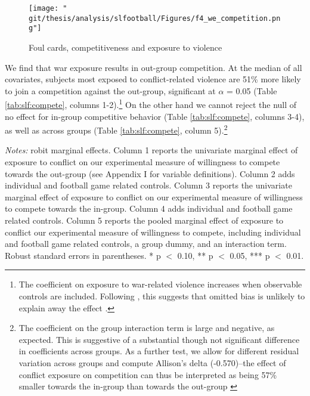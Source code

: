 \begin{figure}[htb]
  \texttt{[image: "\\git/thesis/analysis/slfootball/Figures/f4\_we\_competition.png"]}
  \caption{Foul cards, competitiveness and exposure to violence}
  \label{fig:slf:we_competition}
\end{figure}

We find that war exposure results in out-group competition. At the median of all covariates, subjects most exposed to conflict-related violence are 51\% more likely to join a competition against the out-group, significant at $\alpha$ = 0.05 (Table \ref{tab:slf:compete}, columns 1-2).\footnote{The coefficient on exposure to war-related violence increases when observable controls are included. Following \citet{Bellows2009b}, this suggests that omitted bias is unlikely to explain away the effect \citep[see also][]{Altonji2005}.} On the other hand we cannot reject the null of no effect for in-group competitive behavior (Table \ref{tab:slf:compete}, columns 3-4), as well as across groups (Table \ref{tab:slf:compete}, column 5).\footnote{The coefficient on the group interaction term is large and negative, as expected. This is suggestive of a substantial though not significant difference in coefficients across groups. As a further test, we allow for different residual variation across groups and compute Allison’s delta (-0.570)--the effect of conflict exposure on competition can thus be interpreted as being 57\% smaller towards the in-group than towards the out-group \citep{Allison1999a}}

\begin{threeparttable}[htb]
	\caption{Willingness to Compete}
	\label{tab:slf:compete}
	\centering
	\tiny
	
	\begin{tablenotes}
		\item \textit{Notes:} robit marginal effects. Column 1 reports the univariate marginal effect of exposure to conflict on our experimental measure of willingness to compete towards the out-group (see Appendix I for variable definitions). Column 2 adds individual and football game related controls. Column 3 reports the univariate marginal effect of exposure to conflict on our experimental measure of willingness to compete towards the in-group. Column 4 adds individual and football game related controls. Column 5 reports the pooled marginal effect of exposure to conflict our experimental measure of willingness to compete, including individual and football game related controls, a group dummy, and an interaction term. Robust standard errors in parentheses. * p $<$ 0.10, ** p $<$ 0.05, *** p $<$ 0.01.
		\item
	\end{tablenotes}
\end{threeparttable}



